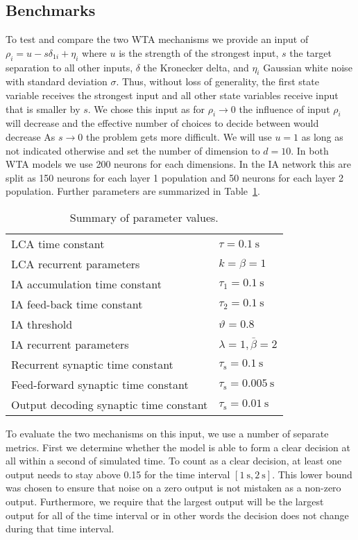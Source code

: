 \documentclass[10pt,letterpaper]{article}
\begin{document}
\subsection{Benchmarks}
To test and compare the two WTA mechanisms we provide an input of $\rho_i 
= u - s \delta_{1i} + \eta_i$ where $u$ is the strength of the strongest input, 
$s$ the target separation to all other inputs, $\delta$ the Kronecker delta, and 
$\eta_i$ Gaussian white noise with standard deviation $\sigma$. Thus, without 
loss of generality, the first state variable receives the strongest input and 
all other state variables receive input that is smaller by $s$. We chose this 
input as for $\rho_i \rightarrow 0$ the influence of input $\rho_i$ will 
decrease and the effective number of choices to decide between would decrease  
As $s \rightarrow 0$ the problem gets more difficult. We will use $u = 1$ as 
long as not indicated otherwise and set the number of dimension to $d = 10$.  In 
both WTA models we use 200 neurons for each dimensions. In the IA network this 
are split as 150 neurons for each layer 1 population and 50 neurons for each 
layer 2 population. Further parameters are summarized in Table~\ref{tbl:params}.
\begin{table}
    \caption{Summary of parameter values.}\label{tbl:params}
    \begin{tabular}{ll}
        LCA time constant & $\tau = \SI{0.1}{\second}$ \\
        LCA recurrent parameters & $k = \beta = 1$ \\
        IA accumulation time constant & $\tau_1 = \SI{0.1}{\second}$ \\
        IA feed-back time constant & $\tau_2 = \SI{0.1}{\second}$ \\
        IA threshold & $\vartheta = 0.8$ \\
        IA recurrent parameters & $\lambda = 1, \bar{\beta} = 2$ \\
        Recurrent synaptic time constant & $\tau_{\mathrm{s}} 
        = \SI{0.1}{\second}$ \\
        Feed-forward synaptic time constant & $\tau_{\mathrm{s}} 
        = \SI{0.005}{\second}$ \\
        Output decoding synaptic time constant & $\tau_{\mathrm{s}} 
        = \SI{0.01}{\second}$
    \end{tabular}
\end{table}

To evaluate the two mechanisms on this input, we use a number of separate metrics. First 
we determine whether the model is able to form a clear decision at all within 
a second of simulated time. To count as a clear decision, at least one output 
needs to stay above 0.15 for the time interval
$[\SI{1}{\second}, \SI{2}{\second}]$. %
This lower bound was chosen to ensure that noise on a zero output is not 
mistaken as a non-zero output.  Furthermore, we require that the largest output 
will be the largest output for all of the time interval or in other words the 
decision does not change during that time interval.
\end{document}
